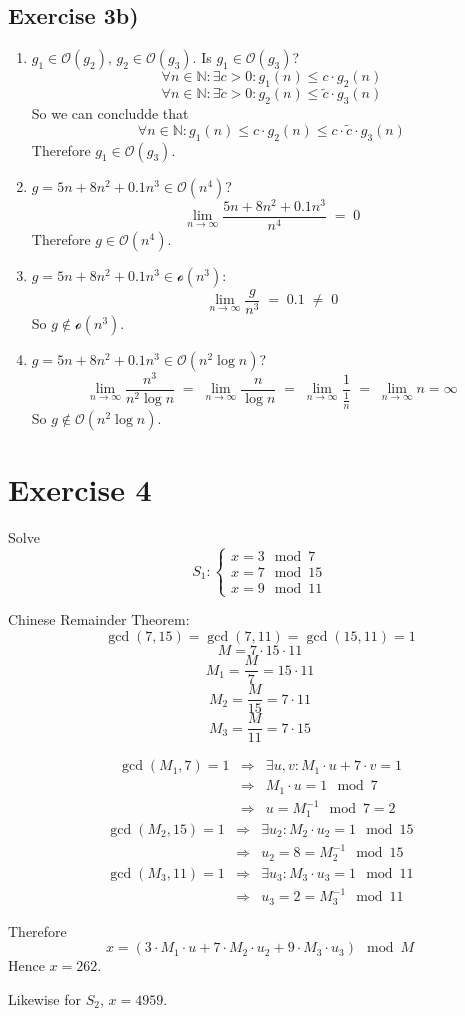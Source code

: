 \documentclass[a4paper]{scrreprt}
\newcommand\N{\mathbb N}
\begin{document}
\subsection*{Exercise 3b)}

\begin{enumerate}[label=(\roman*)]
    \item $g_1\in\mathcal O(g_2),\,g_2\in\mathcal O(g_3)$. Is $g_1\in\mathcal O(g_3)$?
        \[\forall n\in\N:\exists c>0:g_1(n)\leq c\cdot g_2(n)\]
        \[\forall n\in\N:\exists \tilde c>0:g_2(n)\leq \tilde c\cdot g_3(n)\]
        So we can concludde that
        \[\forall n\in\N:g_1(n)\leq c\cdot g_2(n)\leq c\cdot\tilde c\cdot g_3(n)\]
        Therefore $g_1\in\mathcal O(g_3)$.

    \item $g=5n+8n^2+0.1n^3\in\mathcal O(n^4)$?
        \[\lim_{n\rightarrow\infty}\frac{5n+8n^2+0.1n^3}{n^4}\;=\;0\]
        Therefore $g\in\mathcal O(n^4)$.

    \item $g=5n+8n^2+0.1n^3\in\mathcal o(n^3)$:
        \[\lim_{n\rightarrow\infty}\frac g{n^3}\;=\;0.1\;\neq\;0\]
        So $g\not\in\mathcal o(n^3)$.

    \item $g=5n+8n^2+0.1n^3\in\mathcal O(n^2\log n)$?
        \[\lim_{n\rightarrow\infty}\frac{n^3}{n^2\log n}\;=\;\lim_{n\rightarrow\infty}\frac n{\log n}
            \;=\;\lim_{n\rightarrow\infty} \frac 1{\frac 1 n}\;=\;\lim_{n\rightarrow\infty}n=\infty\]
        So $g\not\in\mathcal O(n^2\log n)$.
\end{enumerate}


\section*{Exercise 4}

Solve\[S_1:\left\{\begin{array}{c}x=3\mod 7\\x=7\mod 15\\x=9\mod 11\end{array}\right.\]

Chinese Remainder Theorem:
\[\gcd(7,15)=\gcd(7,11)=\gcd(15,11)=1\]
\[M=7\cdot15\cdot11\]
\[M_1=\frac M 7=15\cdot 11\]
\[M_2=\frac M {15}=7\cdot 11\]
\[M_3=\frac M {11}=7\cdot 15\]

\begin{eqnarray*}
    \gcd(M_1,7)=1 &\Rightarrow& \exists u,v:M_1\cdot u + 7 \cdot v=1\\
    &\Rightarrow& M_1\cdot u=1\mod 7\\
    &\Rightarrow& u=M_1^{-1}\mod 7=2
\end{eqnarray*}
\begin{eqnarray*}
    \gcd(M_2,15)=1 &\Rightarrow& \exists u_2:M_2\cdot u_2=1\mod 15\\
    &\Rightarrow& u_2=8=M_2^{-1}\mod 15
\end{eqnarray*}
\begin{eqnarray*}
    \gcd(M_3,11)=1 &\Rightarrow& \exists u_3:M_3\cdot u_3=1\mod 11\\
    &\Rightarrow& u_3=2=M_3^{-1}\mod 11
\end{eqnarray*}

Therefore
\[x=(3\cdot M_1\cdot u+7\cdot M_2\cdot u_2+9\cdot M_3\cdot u_3)\mod M\]
Hence $x=262$.

Likewise for $S_2$, $x=4959$.
\end{document}
